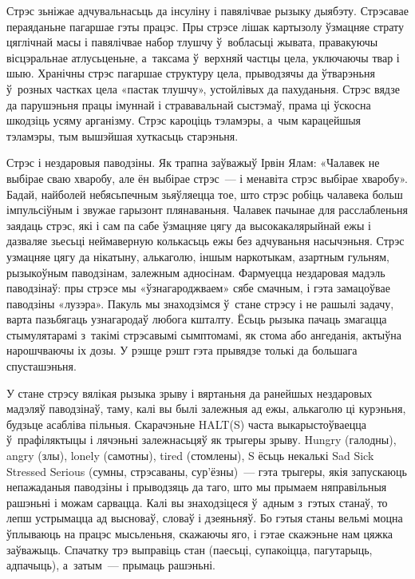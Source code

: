 Стрэс зьніжае адчувальнасьць да інсуліну і павялічвае рызыку дыябэту. Стрэсавае пераяданьне пагаршае гэты працэс. Пры стрэсе лішак картызолу ўзмацняе страту цяглічнай масы і павялічвае набор тлушчу ў~вобласьці жывата, правакуючы вісцэральнае атлусьценьне, а~таксама ў~верхняй частцы цела, уключаючы твар і шыю. Хранічны стрэс пагаршае структуру цела, прыводзячы да ўтварэньня ў~розных частках цела «пастак тлушчу», устойлівых да пахуданьня. Стрэс вядзе да парушэньня працы імуннай і стрававальнай сыстэмаў, прама ці ўскосна шкодзіць усяму арганізму. Стрэс кароціць тэламэры, а~чым карацейшыя тэламэры, тым вышэйшая хуткасьць старэньня.

Стрэс і нездаровыя паводзіны. Як трапна заўважыў Ірвін Ялам: «Чалавек не выбірае сваю хваробу, але ён выбірае стрэс~--- і менавіта стрэс выбірае хваробу». Бадай, найболей небясьпечным зьяўляецца тое, што стрэс робіць чалавека больш імпульсіўным і звужае гарызонт плянаваньня. Чалавек пачынае для расслабленьня заядаць стрэс, які і сам па сабе ўзмацняе цягу да высокакалярыйнай ежы і дазваляе зьесьці неймаверную колькасьць ежы без адчуваньня насычэньня. Стрэс узмацняе цягу да нікатыну, алькаголю, іншым наркотыкам, азартным гульням, рызыкоўным паводзінам, залежным адносінам. Фармуецца нездаровая мадэль паводзінаў: пры стрэсе мы «ўзнагароджваем» сябе смачным, і гэта замацоўвае паводзіны «лузэра». Пакуль мы знаходзімся ў~стане стрэсу і не рашылі задачу, варта пазьбягаць узнагародаў любога кшталту. Ёсьць рызыка пачаць змагацца стымулятарамі з~такімі стрэсавымі сымптомамі, як стома або ангеданія, актыўна нарошчваючы іх дозы. У рэшце рэшт гэта прывядзе толькі да большага спусташэньня. 

У стане стрэсу вялікая рызыка зрыву і вяртаньня да ранейшых нездаровых мадэляў паводзінаў, таму, калі вы былі залежныя ад ежы, алькаголю ці курэньня, будзьце асабліва пільныя. Скарачэньне HALT(S) часта выкарыстоўваецца ў~прафіляктыцы і лячэньні залежнасьцяў як трыгеры зрыву. Hungry (галодны), angry (злы), lonely (самотны), tired (стомлены), S ёсьць некалькі Sad Sick Stressed Serious (сумны, стрэсаваны, сур'ёзны)~--- гэта трыгеры, якія запускаюць непажаданыя паводзіны і прыводзяць да таго, што мы прымаем няправільныя рашэньні і можам сарвацца. Калі вы знаходзіцеся ў~адным з~гэтых станаў, то лепш устрымацца ад высноваў, словаў і дзеяньняў. Бо гэтыя станы вельмі моцна ўплываюць на працэс мысьленьня, скажаючы яго, і гэтае скажэньне нам цяжка заўважыць. Спачатку трэ выправіць стан (паесьці, супакоіцца, пагутарыць, адпачыць), а~затым~--- прымаць рашэньні.

